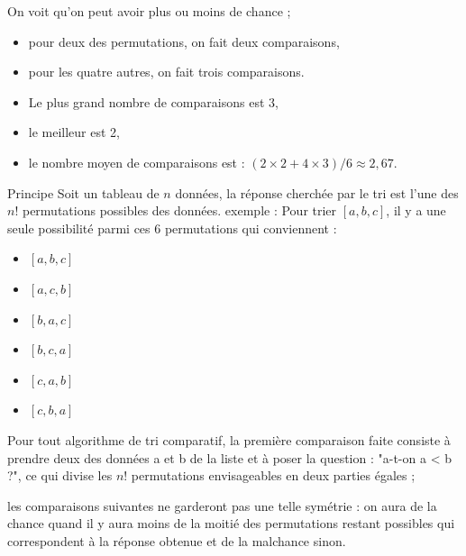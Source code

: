 On voit qu'on peut avoir plus ou moins de chance ; 
\begin{itemize}
\item pour deux des permutations, on fait deux comparaisons, 
\item pour les quatre autres, on fait trois comparaisons. 
\item Le plus grand nombre de comparaisons est 3,
\item le meilleur est 2,
\item le nombre moyen de comparaisons est : $(2 \times 2 + 4 \times 3) / 6 \approx 2,67$.
\end{itemize}


\begin{prop}{Principe}
Soit un tableau de $n$ données, la réponse cherchée par le tri est l'une des $n!$ permutations possibles des données. 
exemple : Pour trier $[a,b,c]$, il y a une seule possibilité parmi ces 6 permutations qui conviennent :
\begin{itemize}
\item $[a,b,c]$
\item $[a,c,b]$
\item $[b,a,c]$
\item $[b,c,a]$
\item $[c,a,b]$
\item $[c,b,a]$
\end{itemize}

Pour tout algorithme de tri comparatif, la première comparaison faite consiste à prendre
deux des données a et b de la liste et à poser la question : "a-t-on a < b ?", ce qui divise les
$n!$ permutations envisageables en deux parties égales ;
\end{prop}

\begin{rem}
 les comparaisons suivantes ne garderont pas une telle symétrie : on aura de la chance quand il y aura moins de la moitié des
permutations restant possibles qui correspondent à la réponse obtenue et de la malchance
sinon. 
\end{rem}

